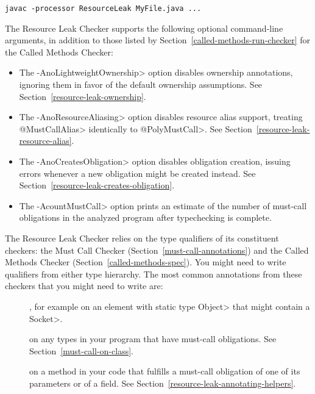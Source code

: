 
\begin{Verbatim}
javac -processor ResourceLeak MyFile.java ...
\end{Verbatim}

The Resource Leak Checker supports the following optional command-line arguments,
in addition to those listed by Section~\ref{called-methods-run-checker} for
the Called Methods Checker:
\begin{itemize}
\item The \<-AnoLightweightOwnership> option disables ownership annotations,
 ignoring them in favor of the default ownership assumptions.
 See Section~\ref{resource-leak-ownership}.
\item The \<-AnoResourceAliasing> option disables resource alias support,
 treating \<@MustCallAlias> identically to \<@PolyMustCall>.
 See Section~\ref{resource-leak-resource-alias}.
\item The \<-AnoCreatesObligation> option disables obligation creation,
 issuing errors whenever a new obligation might be created instead.
 See Section~\ref{resource-leak-creates-obligation}.
\item The \<-AcountMustCall> option prints an estimate of the number of
must-call obligations in the analyzed program after typechecking is complete.
\end{itemize}


The Resource Leak Checker relies on the type qualifiers of its constituent checkers:
the Must Call Checker (Section~\ref{must-call-annotations}) and
the Called Methods Checker (Section~\ref{called-methods-spec}). You might need
to write qualifiers from either type hierarchy. The most common annotations from
these checkers that you might need to write are:

\begin{description}

\item[],
for example on an element with static type \<Object> that might contain a \<Socket>.

\item[]
on any types in your program that have must-call obligations. See Section~\ref{must-call-on-class}.

\item[] on a method in
your code that fulfills a must-call obligation of one of its parameters or of a field.
See Section~\ref{resource-leak-annotating-helpers}.

\end{description}

